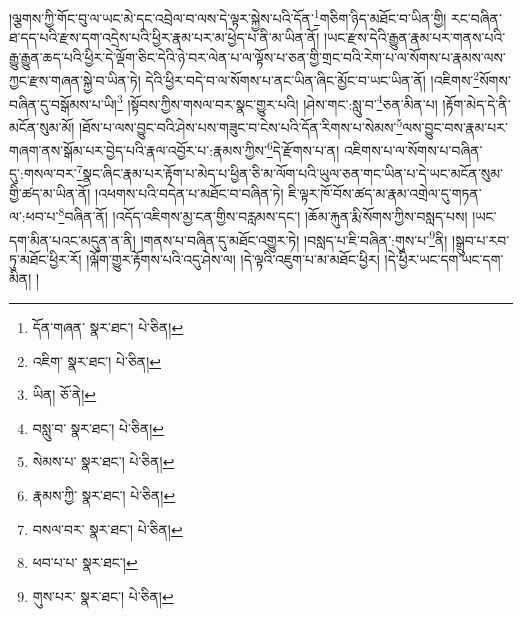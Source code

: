 །ལྕགས་ཀྱི་གོང་བུ་ལ་ཡང་མེ་དང་འབྲེལ་བ་ལས་དེ་ལྟར་སྐྱེས་པའི་དོན་\footnote{དོན་གཞན་  སྣར་ཐང་།  པེ་ཅིན། }གཅིག་ཉིད་མཐོང་བ་ཡིན་གྱི། རང་བཞིན་ཐ་དད་པའི་རྫས་དག་འདྲེས་པའི་ཕྱིར་རྣམ་པར་མ་ཕྱེད་པ་ནི་མ་ཡིན་ནོ། །ཡང་རྫས་དེའི་རྒྱུན་རྣམ་པར་གནས་པའི་རྒྱུ་རྒྱུན་ཆད་པའི་ཕྱིར་དེ་ལྡོག་ཅིང་དེའི་ཉེ་བར་ལེན་པ་ལ་ལྟོས་པ་ཅན་གྱི་གྲང་བའི་རེག་པ་ལ་སོགས་པ་རྣམས་ལས་ཀྱང་རྫས་གཞན་སྐྱེ་བ་ཡིན་ཏེ། དེའི་ཕྱིར་བདེ་བ་ལ་སོགས་པ་ནང་ཡིན་ཞིང་མྱོང་བ་ཡང་ཡིན་ནོ། །འཇིགས་\footnote{འཇིག་  སྣར་ཐང་།  པེ་ཅིན། }སོགས་བཞིན་དུ་བསྒོམས་པ་ཡི།\footnote{ཡིན།  ཅོ་ནེ། } །སྟོབས་ཀྱིས་གསལ་བར་སྣང་གྱུར་པའི། །ཤེས་གང་:སླུ་བ་\footnote{བསླུ་བ་  སྣར་ཐང་།  པེ་ཅིན། }ཅན་མིན་པ། །རྟོག་མེད་དེ་ནི་མངོན་སུམ་མོ། །ཐོས་པ་ལས་བྱུང་བའི་ཤེས་པས་གཟུང་བ་ངེས་པའི་དོན་རིགས་པ་སེམས་\footnote{སེམས་པ་  སྣར་ཐང་།  པེ་ཅིན། }ལས་བྱུང་བས་རྣམ་པར་གཞག་ནས་སྒོམ་པར་བྱེད་པའི་རྣལ་འབྱོར་པ་:རྣམས་ཀྱིས་\footnote{རྣམས་ཀྱི་  སྣར་ཐང་།  པེ་ཅིན། }དེ་རྫོགས་པ་ན། འཇིགས་པ་ལ་སོགས་པ་བཞིན་དུ་:གསལ་བར་\footnote{བསལ་བར་  སྣར་ཐང་།  པེ་ཅིན། }སྣང་ཞིང་རྣམ་པར་རྟོག་པ་མེད་པ་ཕྱིན་ཅི་མ་ལོག་པའི་ཡུལ་ཅན་གང་ཡིན་པ་དེ་ཡང་མངོན་སུམ་གྱི་ཚད་མ་ཡིན་ནོ། །འཕགས་པའི་བདེན་པ་མཐོང་བ་བཞིན་ཏེ། ཇི་ལྟར་ཁོ་བོས་ཚད་མ་རྣམ་འགྲེལ་དུ་གཏན་ལ་:ཕབ་པ་\footnote{ཕབ་པ་པ་  སྣར་ཐང་། }བཞིན་ནོ། །འདོད་འཇིགས་མྱ་ངན་གྱིས་བརླམས་དང་། །ཆོམ་རྐུན་རྨི་སོགས་ཀྱིས་བསླད་པས། །ཡང་དག་མིན་པའང་མདུན་ན་ནི། །གནས་པ་བཞིན་དུ་མཐོང་འགྱུར་ཏེ། །བསླད་པ་ཇི་བཞིན་:གུས་པ་\footnote{གུས་པར་  སྣར་ཐང་།  པེ་ཅིན། }ནི། །སྒྲུབ་པ་རབ་ཏུ་མཐོང་ཕྱིར་རོ། །ལྐོག་གྱུར་རྟོགས་པའི་འདུ་ཤེས་ལ། །དེ་ལྟའི་འཇུག་པ་མ་མཐོང་ཕྱིར། །དེ་ཕྱིར་ཡང་དག་ཡང་དག་མིན། །
